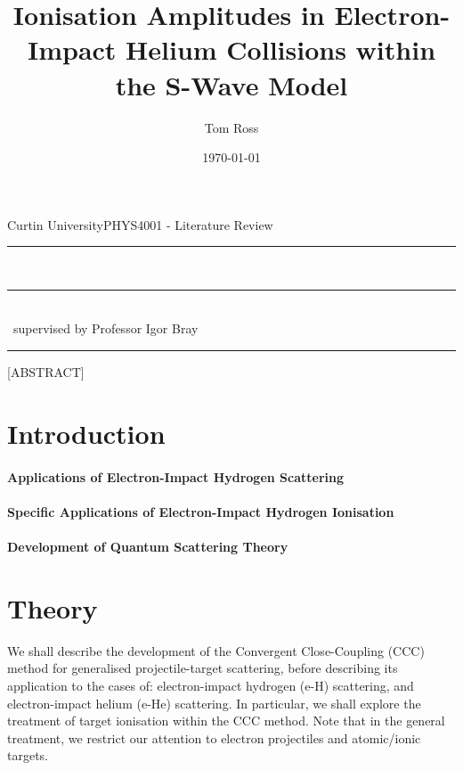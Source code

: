 \documentclass[draft]{article}
\title{Ionisation Amplitudes in Electron-Impact Helium Collisions within the
  S-Wave Model}
\author{Tom Ross}
\date{\today}
\gdef\theassessment{PHYS4001 - Literature Review}
\gdef\thesupervisor{Professor Igor Bray}
\gdef\theinstitution{Curtin University}
\begin{document}

\begin{titlepage}
  \begin{flushleft}
    \theinstitution \hfill \theassessment
  \end{flushleft}
  \hrule
  \begin{center}
    {
      \huge
      \thetitle
    }
    ~\\
    \rule[1.0pt]{8.5cm}{0.4pt}
    ~\\
    {
      \large
      \theauthor ~supervised by \thesupervisor
    }
  \end{center}
  \hrule
  \begin{center}
    [ABSTRACT]
  \end{center}
\end{titlepage}

\clearpage


\tableofcontents

\listoffigures

\listoftables


\clearpage

\section{Introduction}
\label{sec:introduction}

\paragraph{Applications of Electron-Impact Hydrogen Scattering}

\paragraph{Specific Applications of Electron-Impact Hydrogen Ionisation}

\paragraph{Development of Quantum Scattering Theory}

\section{Theory}
\label{sec:theory}

We shall describe the development of the Convergent Close-Coupling (CCC) method
for generalised projectile-target scattering, before describing its application
to the cases of: electron-impact hydrogen (e-H) scattering, and electron-impact
helium (e-He) scattering.
In particular, we shall explore the treatment of target ionisation within the CCC
method.
Note that in the general treatment, we restrict our attention to electron
projectiles and atomic/ionic targets.
\end{document}
